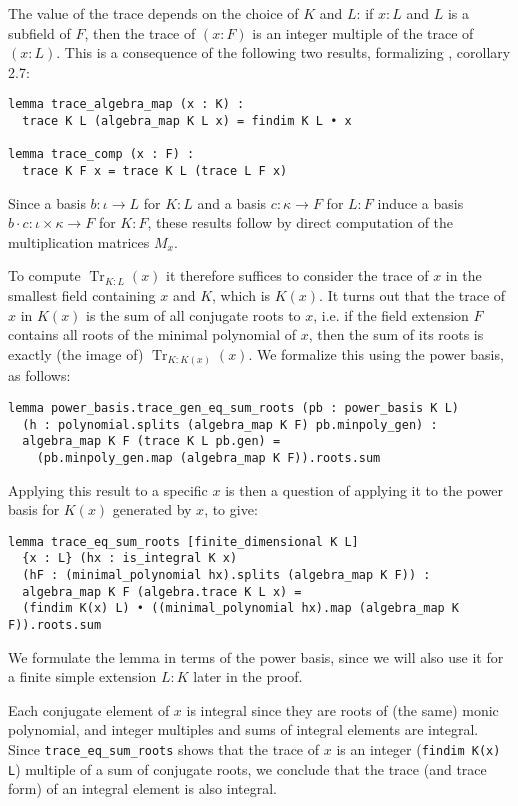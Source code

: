 \documentclass{lipics-v2021}
\newcommand{\lean}[1]{\texttt{#1}\xspace} %
\DeclareMathOperator{\Tr}{\mathrm{Tr}}
\begin{document}
The value of the trace depends on the choice of $K$ and $L$: if $x : L$ and $L$ is a subfield of $F$,
then the trace of $(x : F)$ is an integer multiple of the trace of $(x : L)$.
This is a consequence of the following two results, formalizing \cite{Neukirch}, corollary 2.7:
\begin{lstlisting}
lemma trace_algebra_map (x : K) :
  trace K L (algebra_map K L x) = findim K L • x

lemma trace_comp (x : F) :
  trace K F x = trace K L (trace L F x)
\end{lstlisting}
Since a basis $b : \iota \to L$ for $K : L$ and a basis $c : \kappa \to F$ for $L : F$ induce a basis $b \cdot c : \iota \times \kappa \to F$ for $K : F$,
these results follow by direct computation of the multiplication matrices $M_x$.

To compute $\Tr_{K : L}(x)$ it therefore suffices to consider the trace of $x$ in the smallest field containing $x$ and $K$, which is $K(x)$.
It turns out that the trace of $x$ in $K(x)$ is the sum of all conjugate roots to $x$,
i.e. if the field extension $F$ contains all roots of the minimal polynomial of $x$, then the sum of its roots is exactly (the image of) $\Tr_{K : K(x)}(x)$.
We formalize this using the power basis, as follows:
\begin{lstlisting}
lemma power_basis.trace_gen_eq_sum_roots (pb : power_basis K L)
  (h : polynomial.splits (algebra_map K F) pb.minpoly_gen) :
  algebra_map K F (trace K L pb.gen) =
    (pb.minpoly_gen.map (algebra_map K F)).roots.sum
\end{lstlisting}
Applying this result to a specific $x$ is then a question of applying it to the power basis for $K(x)$ generated by $x$, to give:
\begin{lstlisting}
lemma trace_eq_sum_roots [finite_dimensional K L]
  {x : L} (hx : is_integral K x)
  (hF : (minimal_polynomial hx).splits (algebra_map K F)) :
  algebra_map K F (algebra.trace K L x) =
  (findim K(x) L) • ((minimal_polynomial hx).map (algebra_map K F)).roots.sum
\end{lstlisting}
We formulate the lemma in terms of the power basis, since we will also use it for a finite simple extension $L : K$ later in the proof.

Each conjugate element of $x$ is integral since they are roots of (the same) monic polynomial,
and integer multiples and sums of integral elements are integral.
Since \lean{trace\_eq\_sum\_roots} shows that the trace of $x$ is an integer (\lean{findim K(x) L}) multiple of a sum of conjugate roots,
we conclude that the trace (and trace form) of an integral element is also integral.
\end{document}
